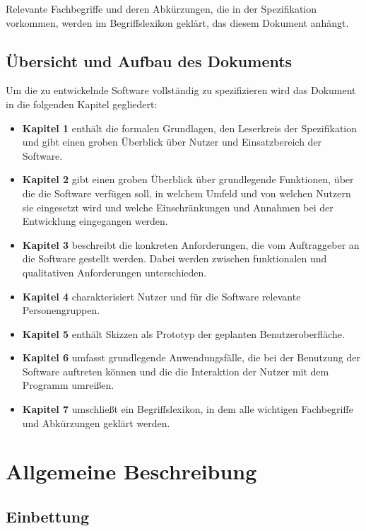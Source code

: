 \documentclass[11pt]{article}
\begin{document}
Relevante Fachbegriffe und deren Abkürzungen, die in der Spezifikation vorkommen, werden im Begriffslexikon geklärt, das diesem Dokument anhängt.

\subsection{Übersicht und Aufbau des Dokuments}

Um die zu entwickelnde Software vollständig zu spezifizieren wird das Dokument in die folgenden Kapitel gegliedert:
\begin{itemize}
	\item[] \textbf{Kapitel 1} enthält die formalen Grundlagen, den Leserkreis der Spezifikation und gibt einen groben Überblick über Nutzer und Einsatzbereich der Software.
	\item[] \textbf{Kapitel 2} gibt einen groben Überblick über grundlegende Funktionen, über die die Software verfügen soll, in welchem Umfeld und von welchen Nutzern sie eingesetzt wird und welche Einschränkungen und Annahmen bei der Entwicklung eingegangen werden.
	\item[] \textbf{Kapitel 3} beschreibt die konkreten Anforderungen, die vom Auftraggeber an die Software gestellt werden. Dabei werden zwischen funktionalen und qualitativen Anforderungen unterschieden.
	\item[] \textbf{Kapitel 4} charakterisiert Nutzer und für die Software relevante Personengruppen.
	\item[] \textbf{Kapitel 5} enthält Skizzen als Prototyp der geplanten Benutzeroberfläche.
	\item[] \textbf{Kapitel 6} umfasst grundlegende Anwendungsfälle, die bei der Benutzung der Software auftreten können und die die Interaktion der Nutzer mit dem Programm umreißen.
	\item[] \textbf{Kapitel 7} umschließt ein Begriffslexikon, in dem alle wichtigen Fachbegriffe und Abkürzungen geklärt werden.
\end{itemize}

\newpage

\section{Allgemeine Beschreibung}

\subsection{Einbettung}
\end{document}
